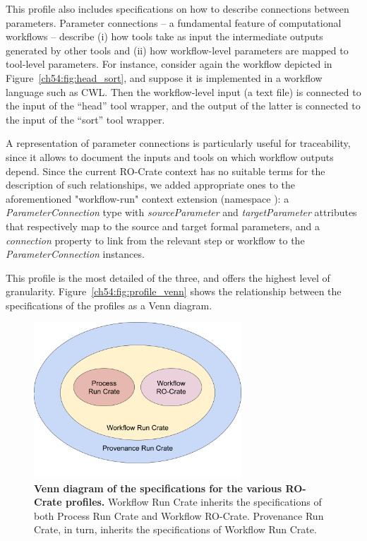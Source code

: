 This profile also includes specifications on how to describe connections between parameters.
Parameter connections -- a fundamental feature of computational workflows -- describe (i) how tools take as input the intermediate outputs generated by other tools and (ii) how workflow-level parameters are mapped to tool-level parameters.
For instance, consider again the workflow depicted in Figure~\vref{ch54:fig:head_sort},
and suppose it is implemented in a workflow language such as CWL. Then the workflow-level input (a text file) is connected to the input of the “head” tool wrapper, and the output of the latter is connected to the input of the “sort” tool wrapper.


A representation of parameter connections is particularly useful for traceability, since it allows to document the inputs and tools on which workflow outputs depend.
Since the current RO-Crate context has no suitable terms for the description of such relationships, 
we added appropriate ones to the aforementioned  "workflow-run" context extension (namespace ):
a \emph{ParameterConnection} type with
\emph{sourceParameter} and \emph{targetParameter} attributes that respectively map to the source and target formal parameters, and a
\emph{connection} property to link from the relevant step or workflow to the \emph{ParameterConnection} instances.

This profile is the most detailed of the three, and offers the highest level of granularity. Figure~\vref{ch54:fig:profile_venn} shows the relationship between the specifications of the profiles as a Venn diagram.

\begin{figure}[!h]
  \includegraphics[width=21em]{figures/ch54/venn.png}
  \caption{{\bf Venn diagram of the specifications for the various RO-Crate profiles.}
  Workflow Run Crate inherits the specifications of both Process Run Crate and Workflow RO-Crate. Provenance Run Crate, in turn, inherits the specifications of Workflow Run Crate.}
  \label{ch54:fig:profile_venn}
  \end{figure}


